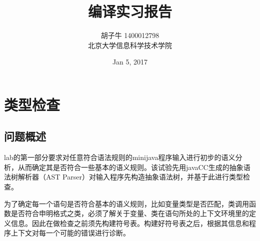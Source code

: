 \documentclass[10pt,a4paper]{article}
\author{胡子牛  1400012798\\[2ex]
    北京大学信息科学技术学院\\[2ex]}
\title{编译实习报告}
\date{Jan 5, 2017}
\begin{document}
\makeatletter
\let\@afterindentfalse\@afterindenttrue
\@afterindenttrue
\makeatother
\setlength{\parindent}{2em}  %

\maketitle

\section{类型检查}

\subsection{问题概述}
lab的第一部分要求对任意符合语法规则的minijava程序输入进行初步的语义分析，从而确定其是否符合一些基本的语义规则。该试验先用javaCC生成的抽象语法树解析器（AST Parser）对输入程序先构造抽象语法树，并基于此进行类型检查。

为了确定每一个语句是否符合基本的语义规则，比如变量类型是否匹配，类调用函数是否符合申明格式之类，必须了解关于变量、类在语句所处的上下文环境里的定义信息。因此在做检查之前须先构建符号表。构建好符号表之后，根据其信息和程序上下文对每一个可能的错误进行诊断。
\end{document}
